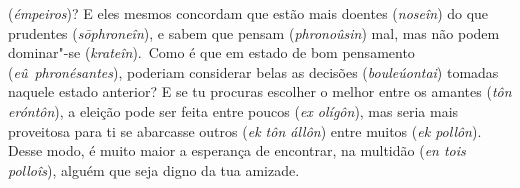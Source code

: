 (\emph{émpeiros})? E eles mesmos concordam que estão mais doentes
(\emph{noseîn}) do que prudentes (\emph{sōphroneîn}), e sabem que pensam
(\emph{phronoûsin}) mal, mas não podem dominar"-se (\emph{krateîn}).~Como
é que em estado de bom pensamento (\emph{eû}~\emph{phronésantes}),
poderiam considerar belas as decisões (\emph{bouleúontai}) tomadas
naquele estado anterior? E se tu procuras escolher o melhor entre os
amantes (\emph{tôn eróntôn}), a eleição pode ser feita entre poucos
(\emph{ex olígôn}), mas seria mais proveitosa para ti se abarcasse
outros (\emph{ek tôn állôn}) entre muitos (\emph{ek pollôn}). \bekker{[231e]}
Desse modo, é muito maior a esperança de encontrar, na multidão
(\emph{en tois polloîs}), alguém que seja digno da tua amizade.

